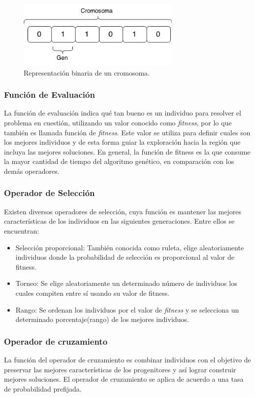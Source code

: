 \begin{figure}[H]
	\centering
	\includegraphics[width=8cm]{Figures/rep_binaria}
	\caption{Representación binaria de un cromosoma.}
	\label{fig:rep_binaria}
\end{figure}


\subsubsection{Función de Evaluación} 
La función de evaluación indica qué tan bueno es un individuo para resolver el problema en cuestión, utilizando un valor conocido como \emph{fitness}, por lo que también es llamada función de \emph{fitness}. Este valor se utiliza para definir cuales son los mejores individuos y de esta forma guiar la exploración hacia la región que incluya las mejores soluciones. En general, la función de fitness es la que consume la mayor cantidad de tiempo del algoritmo genético, en comparación con los demás operadores.

\subsubsection{Operador de Selección}
Existen diversos operadores de selección, cuya función es mantener las mejores características de los individuos en las siguientes generaciones. Entre ellos se encuentran:
\begin{itemize}
	\item Selección proporcional: También conocida como ruleta, elige aleatoriamente individuos donde la probabilidad de selección es proporcional al valor de fitness.
	\item Torneo: Se elige aleatoriamente un determinado número de individuos los cuales compiten entre sí usando su valor de fitness.
	\item Rango: Se ordenan los individuos por el valor de \emph{fitness} y se selecciona un determinado porcentaje(rango) de los mejores individuos.
\end{itemize}

\subsubsection{Operador de cruzamiento}
La función del operador de cruzamiento es combinar individuos con el objetivo de preservar las mejores características de los progenitores y así lograr construir mejores soluciones. El operador de cruzamiento se aplica de acuerdo a una tasa de probabilidad prefijada. 

